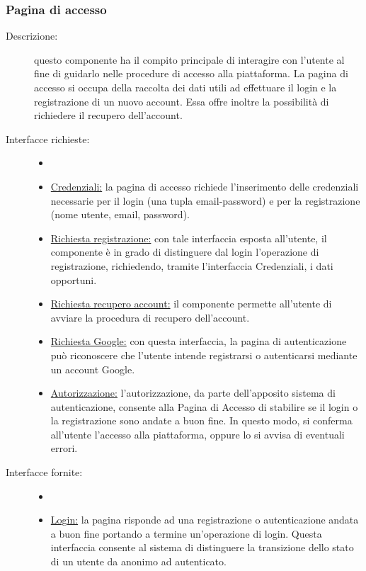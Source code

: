 \documentclass[11pt, a4paper]{article}
\theoremstyle{definition} %
\begin{document}
\subsubsection{Pagina di accesso}
\begin{description}
    \item[Descrizione:] questo componente ha il compito
    principale di interagire con l'utente al fine di guidarlo
    nelle procedure di accesso alla piattaforma.
    La pagina di accesso si occupa della raccolta dei dati
    utili ad effettuare il login e la registrazione
    di un nuovo account. Essa offre inoltre la possibilità di
    richiedere il recupero dell'account.
    \item[Interfacce richieste:]
    \begin{itemize}
        \item[]
        \item \underline{Credenziali:} la pagina di accesso
        richiede l'inserimento delle credenziali necessarie
        per il login (una tupla email-password) e per la
        registrazione (nome utente, email, password).

        \item \underline{Richiesta registrazione:} con tale
        interfaccia esposta all'utente, il componente è in grado
        di distinguere dal login l'operazione di registrazione,
        richiedendo, tramite l'interfaccia Credenziali, i dati
        opportuni.

        \item \underline{Richiesta recupero account:} il componente
        permette all'utente di avviare la procedura di recupero
        dell'account.

        \item \underline{Richiesta Google:} con questa interfaccia,
        la pagina di autenticazione può riconoscere che l'utente
        intende registrarsi o autenticarsi mediante un account
        Google.

        \item \underline{Autorizzazione:} l'autorizzazione, da
        parte dell'apposito sistema di autenticazione, consente
        alla Pagina di Accesso di stabilire se il login o la
        registrazione sono andate a buon fine. In questo modo, si
        conferma all'utente l'accesso alla piattaforma, oppure lo
        si avvisa di eventuali errori.
    \end{itemize}
    \item[Interfacce fornite:]
    \begin{itemize}
        \item[]
        \item \underline{Login:} la pagina risponde ad una registrazione
        o autenticazione andata a buon fine portando a termine un'operazione
        di login. Questa interfaccia consente al sistema di distinguere
        la transizione dello stato di un utente da anonimo ad autenticato.


\end{itemize}
\end{description}
\end{document}
